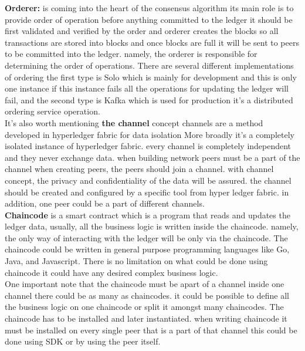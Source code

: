 \textbf{Orderer:} is coming into the heart of the consensus algorithm its main role is to provide order of operation before anything committed to the ledger it should be first validated and verified by the order and orderer creates the blocks so all transactions are stored into blocks and once blocks are full it will be sent to peers to be committed into the ledger. namely, the orderer is responsible for determining the order of operations.
There are several different implementations of ordering the first type is Solo which is mainly for development and this is only one instance if this instance fails all the operations for updating the ledger will fail, and the second type is Kafka which is used for production it's a distributed ordering service operation. \\

It's also worth mentioning \textbf{the channel} concept channels are a method developed in hyperledger fabric for data isolation More broadly it's a completely isolated instance of hyperledger fabric. every channel is completely independent and they never exchange data. when building network peers must be a part of the channel when creating peers, the peers should join a channel. with channel concept, the privacy and confidentiality of the data will be assured. the channel should be created and configured by a specific tool from hyper ledger fabric. in addition, one peer could be a part of different channels.  \\
 

\textbf{Chaincode} is a smart contract which is a program that reads and updates the ledger data, usually, all the business logic is written inside the chaincode. namely, the only way of interacting with the ledger will be only via the chaincode. 
The chaincode could be written in general purpose programming languages like Go, Java, and Javascript. There is no limitation on what could be done using chaincode it could have any desired complex business logic. \\

One important note that the chaincode must be apart of a channel inside one channel there could be as many as chaincodes. it could be possible to define all the business logic on one chaincode or split it amongst many chaincodes. 
The chaincode has to be installed and later instantiated. when writing chaincode it must be installed on every single peer that is a part of that channel this could be done using SDK or by using the peer itself. \\
 
